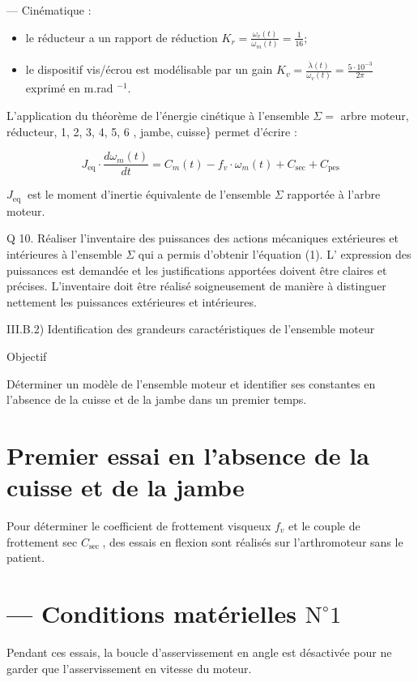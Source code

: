 \documentclass[10pt]{article}
\begin{document}
— Cinématique :

\begin{itemize}
  \item le réducteur a un rapport de réduction $K_{r}=\frac{\omega_{v}(t)}{\omega_{m}(t)}=\frac{1}{16}$;
  \item le dispositif vis/écrou est modélisable par un gain $K_{v}=\frac{\dot{\lambda}(t)}{\omega_{v}(t)}=\frac{5 \cdot 10^{-3}}{2 \pi}$ exprimé en m.rad ${ }^{-1}$.
\end{itemize}

L'application du théorème de l'énergie cinétique à l'ensemble $\Sigma=$ arbre moteur, réducteur, 1, 2, 3, 4, 5, 6 , jambe, cuisse\} permet d'écrire :


\begin{equation*}
J_{\mathrm{eq}} \cdot \frac{d \omega_{m}(t)}{d t}=C_{m}(t)-f_{v} \cdot \omega_{m}(t)+C_{\mathrm{sec}}+C_{\mathrm{pes}} \tag{III.1}
\end{equation*}


$J_{\text {eq }}$ est le moment d'inertie équivalente de l'ensemble $\Sigma$ rapportée à l'arbre moteur.

Q 10. Réaliser l'inventaire des puissances des actions mécaniques extérieures et intérieures à l'ensemble $\Sigma$ qui a permis d'obtenir l'équation (1). L' expression des puissances est demandée et les justifications apportées doivent être claires et précises. L'inventaire doit être réalisé soigneusement de manière à distinguer nettement les puissances extérieures et intérieures.

III.B.2) Identification des grandeurs caractéristiques de l'ensemble moteur

Objectif

Déterminer un modèle de l'ensemble moteur et identifier ses constantes en l'absence de la cuisse et de la jambe dans un premier temps.

\section*{Premier essai en l'absence de la cuisse et de la jambe}
Pour déterminer le coefficient de frottement visqueux $f_{v}$ et le couple de frottement sec $C_{\text {sec }}$, des essais en flexion sont réalisés sur l'arthromoteur sans le patient.

\section*{— Conditions matérielles $\mathrm{N}^{\circ} 1$}
Pendant ces essais, la boucle d'asservissement en angle est désactivée pour ne garder que l'asservissement en vitesse du moteur.
\end{document}
